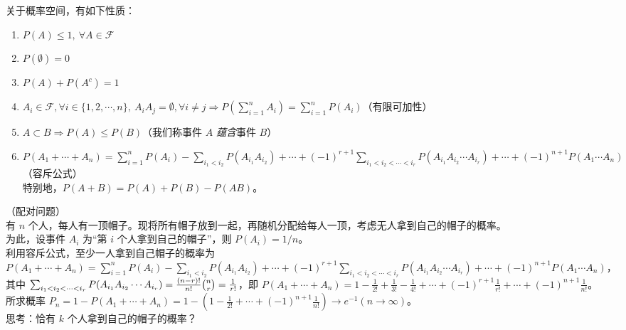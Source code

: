 \documentclass[../main.tex]{subfiles}
\begin{document}
\begin{proposition}
    关于概率空间，有如下性质：
    \begin{enumerate}
        \item $P(A)\leq 1,\ \forall A\in\mathcal{F}$
        \item $P(\emptyset)=0$
        \item $P(A)+P(A^c)=1$
        \item $A_i\in\mathcal{F},\forall i\in\{1,2,\cdots,n\},\ A_iA_j=\emptyset,\forall i\neq j\Rightarrow P(\sum_{i=1}^n A_i)=\sum_{i=1}^n P(A_i)$（有限可加性）
        \item $A\subset B\Rightarrow P(A)\leq P(B)$（我们称事件 $A$ \emph{蕴含}事件 $B$）
        \item $P(A_1+\cdots+A_n)=\sum_{i=1}^n P(A_i)-\sum_{i_1<i_2}P(A_{i_1}A_{i_2})+\cdots+(-1)^{r+1}\sum_{i_1<i_2<\cdots<i_r}P(A_{i_1}A_{i_2}\cdots A_{i_r})+\cdots+(-1)^{n+1}P(A_1\cdots A_n)$（容斥公式）
              \\特别地，$P(A+B)=P(A)+P(B)-P(AB)$。
    \end{enumerate}
\end{proposition}

\begin{example}
    （配对问题）\\
    有 $n$ 个人，每人有一顶帽子。现将所有帽子放到一起，再随机分配给每人一顶，考虑无人拿到自己的帽子的概率。\\
    为此，设事件 $A_i$ 为“第 $i$ 个人拿到自己的帽子”，则 $P(A_i)=1/n$。\\
    利用容斥公式，至少一人拿到自己帽子的概率为 $P(A_1+\cdots+A_n)=\sum_{i=1}^n P(A_i)-\sum_{i_1<i_2}P(A_{i_1}A_{i_2})+\cdots+(-1)^{r+1}\sum_{i_1<i_2<\cdots<i_r}P(A_{i_1}A_{i_2}\cdots A_{i_r})+\cdots+(-1)^{n+1}P(A_1\cdots A_n)$，\\
    其中 $\sum_{i_1<i_2<\cdots<i_r}P(A_{i_1}A_{i_2}\cdots A_{i_r})=\frac{(n-r)!}{n!}\tbinom{n}{r}=\frac{1}{r!}$，即 $P(A_1+\cdots+A_n)=1-\frac{1}{2!}+\frac{1}{3!}-\frac{1}{4!}+\cdots+(-1)^{r+1}\frac{1}{r!}+\cdots+(-1)^{n+1}\frac{1}{n!}$。\\
    所求概率 $P_n=1-P(A_1+\cdots+A_n)=1-(1-\frac{1}{2!}+\cdots+(-1)^{n+1}\frac{1}{n!})\rightarrow e^{-1}(n\rightarrow\infty)$。\\
    思考：恰有 $k$ 个人拿到自己的帽子的概率？
\end{example}
\end{document}
